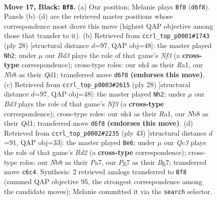 \documentclass[11pt]{article}
\begin{document}
\clearpage

\begin{figure}[p]\centering
\begin{subfigure}{0.46\textwidth}\centering
\resizebox{\linewidth}{!}{%
\newchessgame
\chessboard[
  setfen={rnr3k1/1p1b1ppp/p1qbpn2/B7/7N/3BP3/PP2NPPP/R2QR1K1 b - - 15 17},
  showmover=false,
  pgfstyle=straightmove, color=movearrow, markmove={d6-f8}
]}
\caption{}
\end{subfigure}\hfill
\begin{subfigure}{0.46\textwidth}\centering
\resizebox{\linewidth}{!}{%
\newchessgame
\chessboard[
  setfen={rn1qr1k1/pp3pb1/3p1n1p/2pP1bp1/2P5/2N2N1P/PP1BBPP1/R2Q1RK1 w - - 2 15},
  showmover=false,
  pgfstyle=straightmove, color=movearrow, markmove={f3-h2}
]}
\caption{}
\end{subfigure}
\\[4pt]
\begin{subfigure}{0.46\textwidth}\centering
\resizebox{\linewidth}{!}{%
\newchessgame
\chessboard[
  setfen={rn1qr1k1/pp3pb1/3p1n1p/2pP1bp1/2P5/2N2N1P/PP1BBPP1/R2Q1RK1 w - - 2 15},
  showmover=false,
  pgfstyle=straightmove, color=movearrow, markmove={f3-h2}
]}
\caption{}
\end{subfigure}\hfill
\begin{subfigure}{0.46\textwidth}\centering
\resizebox{\linewidth}{!}{%
\newchessgame
\chessboard[
  setfen={r2r2k1/pp1b1pbp/1qnB1np1/2p3N1/2P5/3B2NP/PP3PP1/2QRR1K1 b - - 2 22},
  showmover=false,
  pgfstyle=straightmove, color=movearrow, markmove={d7-e6}
]}
\caption{}
\end{subfigure}
\caption{\textbf{Move 17, Black: \texttt{Bf8}.} (a) Our position; Melanie plays \texttt{Bf8} (\texttt{d6f8}). Panels (b)--(d) are the retrieved master positions whose correspondence most drove this move (highest QAP objective among those that transfer to it). (b) Retrieved from \texttt{ccrl\_top\_p0001\#1743} (ply 28) [structural distance $d$=97, QAP obj=48]: the master played \texttt{Nh2}; under $\mu$ our \emph{Bd3} plays the role of that game's \emph{Nf3} (a \textbf{cross-type} correspondence); cross-type roles: our \emph{n}h4 as their \emph{R}a1, our \emph{N}b8 as their \emph{Q}d1; transferred move \texttt{d6f8} \textbf{(endorses this move)}. (c) Retrieved from \texttt{ccrl\_top\_p0003\#2615} (ply 28) [structural distance $d$=97, QAP obj=48]: the master played \texttt{Nh2}; under $\mu$ our \emph{Bd3} plays the role of that game's \emph{Nf3} (a \textbf{cross-type} correspondence); cross-type roles: our \emph{n}h4 as their \emph{R}a1, our \emph{N}b8 as their \emph{Q}d1; transferred move \texttt{d6f8} \textbf{(endorses this move)}. (d) Retrieved from \texttt{ccrl\_top\_p0002\#2235} (ply 43) [structural distance $d$=91, QAP obj=33]: the master played \texttt{Be6}; under $\mu$ our \emph{Qc3} plays the role of that game's \emph{Bd2} (a \textbf{cross-type} correspondence); cross-type roles: our \emph{N}b8 as their \emph{P}a7, our \emph{P}g7 as their \emph{B}g7; transferred move \texttt{c6c4}. Synthesis: 2 retrieved analogs transferred to \texttt{Bf8} (summed QAP objective 95, the strongest correspondence among the candidate moves); Melanie committed it via the \texttt{search} selector.}
\label{fig:thought-m33}
\end{figure}
\end{document}
